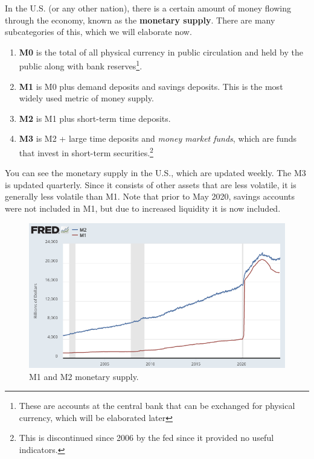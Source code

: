 \documentclass{article}
\begin{document}
    \begin{definition}
      In the U.S. (or any other nation), there is a certain amount of money flowing through the economy, known as the \textbf{monetary supply}. There are many subcategories of this, which we will elaborate now. 
      \begin{enumerate}
        \item \textbf{M0} is the total of all physical currency in public circulation and held by the public along with bank reserves\footnote{These are accounts at the central bank that can be exchanged for physical currency, which will be elaborated later}. 
        \item \textbf{M1} is M0 plus demand deposits and savings deposits. This is the most widely used metric of money supply. 
        \item \textbf{M2} is M1 plus short-term time deposits. 
        \item \textbf{M3} is M2 + large time deposits and \textit{money market funds}, which are funds that invest in short-term securities.\footnote{This is discontinued since 2006 by the fed since it provided no useful indicators. }
      \end{enumerate}
      You can see the monetary supply in the U.S., which are updated weekly. The M3 is updated quarterly. Since it consists of other assets that are less volatile, it is generally less volatile than M1. Note that prior to May 2020, savings accounts were not included in M1, but due to increased liquidity it is now included.
      \begin{figure}[H]
        \centering 
        \includegraphics[scale=0.4]{img/Ms.png}
        \caption{M1 and M2 monetary supply. } 
        \label{fig:Ms}
      \end{figure}
    \end{definition}
\end{document}
